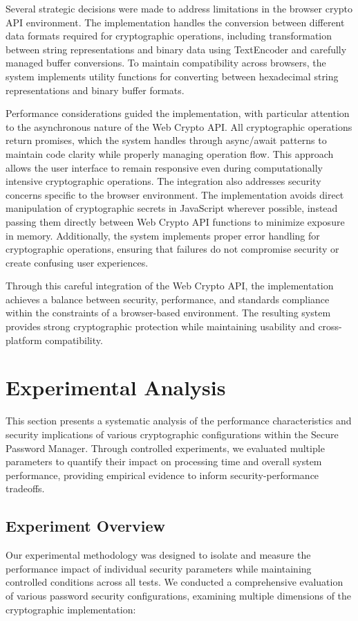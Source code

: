 \documentclass[11pt,a4paper]{article}
\begin{document}
Several strategic decisions were made to address limitations in the browser crypto API environment. The implementation handles the conversion between different data formats required for cryptographic operations, including transformation between string representations and binary data using TextEncoder and carefully managed buffer conversions. To maintain compatibility across browsers, the system implements utility functions for converting between hexadecimal string representations and binary buffer formats.

Performance considerations guided the implementation, with particular attention to the asynchronous nature of the Web Crypto API. All cryptographic operations return promises, which the system handles through async/await patterns to maintain code clarity while properly managing operation flow. This approach allows the user interface to remain responsive even during computationally intensive cryptographic operations.
The integration also addresses security concerns specific to the browser environment. The implementation avoids direct manipulation of cryptographic secrets in JavaScript wherever possible, instead passing them directly between Web Crypto API functions to minimize exposure in memory. Additionally, the system implements proper error handling for cryptographic operations, ensuring that failures do not compromise security or create confusing user experiences.

Through this careful integration of the Web Crypto API, the implementation achieves a balance between security, performance, and standards compliance within the constraints of a browser-based environment. The resulting system provides strong cryptographic protection while maintaining usability and cross-platform compatibility.

\section{Experimental Analysis}
This section presents a systematic analysis of the performance characteristics and security implications of various cryptographic configurations within the Secure Password Manager. Through controlled experiments, we evaluated multiple parameters to quantify their impact on processing time and overall system performance, providing empirical evidence to inform security-performance tradeoffs.

\subsection{Experiment Overview}
Our experimental methodology was designed to isolate and measure the performance impact of individual security parameters while maintaining controlled conditions across all tests. We conducted a comprehensive evaluation of various password security configurations, examining multiple dimensions of the cryptographic implementation:
\end{document}
